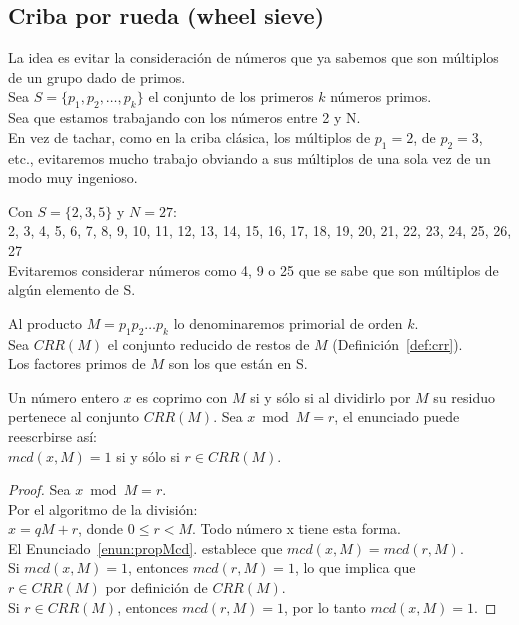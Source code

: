 \subsection{Criba por rueda (wheel sieve)}
La idea es evitar la consideración de números que ya sabemos que son múltiplos de un grupo dado de primos.\\
Sea $S = \{p_1, p_2, \dots, p_k\}$ el conjunto de los primeros $k$ números primos.\\

Sea que estamos trabajando con los números entre 2 y N. \\
En vez de tachar, como en la criba clásica, los múltiplos de $p_1=2$, de $p_2=3$, etc., evitaremos mucho trabajo obviando a sus múltiplos de una sola vez de un modo muy ingenioso.

\begin{ejemplo}
Con $S = \{2,3,5\}$ y $N = 27$:\\
2, 3, 4, 5, 6, 7, 8, 9, 10, 11, 12, 13, 14, 15, 16, 17, 18, 19, 20, 21, 22, 23, 24, 25, 26, 27 \\
Evitaremos considerar números como 4, 9 o 25 que se  sabe que son múltiplos de algún elemento de S.
\end{ejemplo}

Al producto $M = p_1p_2 \dots p_k$ lo denominaremos primorial de orden $k$.\\
Sea $CRR(M)$ el conjunto reducido de restos de $M$ (Definición~\ref{def:crr}). \\
Los factores primos de $M$ son los que están en S.

\begin{enunciado} \label{enun:ppioRuedaResid}\leavevmode\par Un número entero $x$ es coprimo con $M$ si y sólo si al dividirlo por $M$ su residuo pertenece al conjunto $CRR(M)$. Sea $x \bmod M = r$, el enunciado puede reescrbirse así: \\
$mcd(x,M) = 1$ si y sólo si $r \in CRR(M)$.
\end{enunciado}

\begin{proof}
Sea $x \bmod M = r$. \\
Por el algoritmo de la división: \\
$x = qM + r$, donde $0 \le r < M$. Todo número x tiene esta forma.\\
\setcounter{enumi}{7} 
El Enunciado~\ref{enun:propMcd}. establece que $mcd(x,M) = mcd(r,M)$.\\
Si $mcd(x, M) = 1$, entonces $mcd(r,M) = 1$, lo que implica que $r \in CRR(M)$ por definición de $CRR(M)$. \\
Si $r \in CRR(M)$, entonces $mcd(r,M) = 1$, por lo tanto $mcd(x, M) = 1$.
\end{proof}

